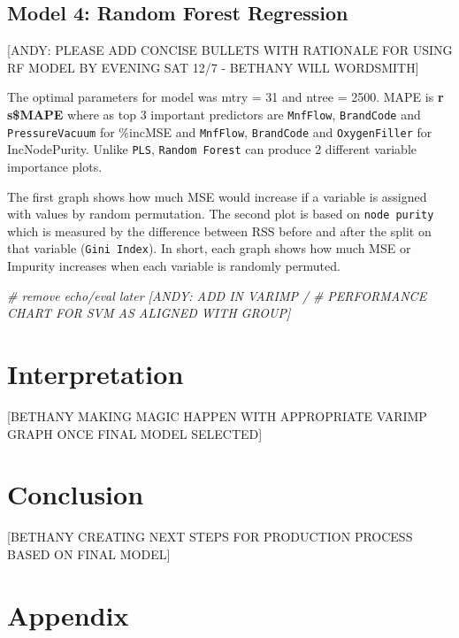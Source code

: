 \documentclass[]{report}
\newenvironment{Shaded}{\begin{snugshade}}{\end{snugshade}}
\newcommand{\CommentTok}[1]{\textcolor[rgb]{0.56,0.35,0.01}{\textit{#1}}}
\begin{document}
\hypertarget{model-4-random-forest-regression}{%
\section{Model 4: Random Forest
Regression}\label{model-4-random-forest-regression}}

{[}ANDY: PLEASE ADD CONCISE BULLETS WITH RATIONALE FOR USING RF MODEL BY
EVENING SAT 12/7 - BETHANY WILL WORDSMITH{]}

The optimal parameters for model was mtry = 31 and ntree = 2500. MAPE is
\textbf{r s\$MAPE} where as top 3 important predictors are
\texttt{MnfFlow}, \texttt{BrandCode} and \texttt{PressureVacuum} for
\%incMSE and \texttt{MnfFlow}, \texttt{BrandCode} and
\texttt{OxygenFiller} for IncNodePurity. Unlike \texttt{PLS},
\texttt{Random\ Forest} can produce 2 different variable importance
plots.

The first graph shows how much MSE would increase if a variable is
assigned with values by random permutation. The second plot is based on
\texttt{node\ purity} which is measured by the difference between RSS
before and after the split on that variable (\texttt{Gini\ Index}). In
short, each graph shows how much MSE or Impurity increases when each
variable is randomly permuted.

\begin{Shaded}
\begin{Highlighting}[]
\CommentTok{# remove echo/eval later [ANDY: ADD IN VARIMP /}
\CommentTok{# PERFORMANCE CHART FOR SVM AS ALIGNED WITH GROUP]}
\end{Highlighting}
\end{Shaded}

\hypertarget{interpretation}{%
\chapter{Interpretation}\label{interpretation}}

{[}BETHANY MAKING MAGIC HAPPEN WITH APPROPRIATE VARIMP GRAPH ONCE FINAL
MODEL SELECTED{]}

\hypertarget{conclusion}{%
\chapter{Conclusion}\label{conclusion}}

{[}BETHANY CREATING NEXT STEPS FOR PRODUCTION PROCESS BASED ON FINAL
MODEL{]}

\hypertarget{Appendix}{%
\chapter*{Appendix}\label{Appendix}}
\end{document}
